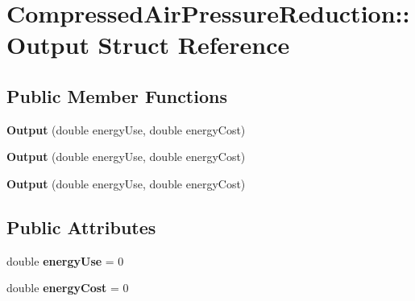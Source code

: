 \hypertarget{struct_compressed_air_pressure_reduction_1_1_output}{}\section{Compressed\+Air\+Pressure\+Reduction\+:\+:Output Struct Reference}
\label{struct_compressed_air_pressure_reduction_1_1_output}
\subsection*{Public Member Functions}
\begin{DoxyCompactItemize}
\item 
\mbox{\label{struct_compressed_air_pressure_reduction_1_1_output_a0372f13246b57b0df1651bed6cc28a57}} 
{\bfseries Output} (double energy\+Use, double energy\+Cost)
\item 
\mbox{\label{struct_compressed_air_pressure_reduction_1_1_output_a0372f13246b57b0df1651bed6cc28a57}} 
{\bfseries Output} (double energy\+Use, double energy\+Cost)
\item 
\mbox{\label{struct_compressed_air_pressure_reduction_1_1_output_a0372f13246b57b0df1651bed6cc28a57}} 
{\bfseries Output} (double energy\+Use, double energy\+Cost)
\end{DoxyCompactItemize}
\subsection*{Public Attributes}
\begin{DoxyCompactItemize}
\item 
\mbox{\label{struct_compressed_air_pressure_reduction_1_1_output_a6074f7440fa5c2ce263db359b751e68e}} 
double {\bfseries energy\+Use} = 0
\item 
\mbox{\label{struct_compressed_air_pressure_reduction_1_1_output_a30f7a58df03ccbd142729b316ba2d0a4}} 
double {\bfseries energy\+Cost} = 0
\end{DoxyCompactItemize}



